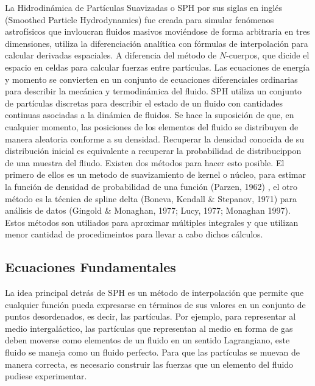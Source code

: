 \documentclass[a4paper,openright,12pt]{book}
\begin{document}
La Hidrodinámica de Partículas Suavizadas o SPH por sus siglas en inglés (Smoothed Particle Hydrodynamics) fue creada para simular fenómenos astrofísicos que invloucran fluidos masivos moviéndose de forma arbitraria en tres dimensiones, utiliza la diferenciación analítica con fórmulas de interpolación para calcular derivadas espaciales. A diferencia del método de $N$-cuerpos, que dicide el espacio en celdas para calcular fuerzas entre partículas. Las ecuaciones de energía y momento se convierten en un conjunto de ecuaciones diferenciales ordinarias para describir la mecánica y termodinámica del fluido. SPH utiliza un conjunto de partículas discretas para describir el estado de un fluido con cantidades continuas asociadas a la dinámica de fluidos. Se hace la suposición de que, en cualquier momento, las posiciones de los elementos del fluido se  distribuyen de manera aleatoria conforme a su densidad. Recuperar la densidad conocida de su distribución inicial es equivalente a recuperar la probabilidad de distribucippon de una muestra del fliudo. Existen dos métodos para hacer esto posible. El primero de ellos es un metodo de suavizamiento de kernel o núcleo, para estimar la función de densidad de probabilidad de una función (Parzen, 1962) \cite{b5.3}, el otro método es la técnica de spline delta (Boneva, Kendall \& Stepanov, 1971) \cite{b5.4} para análisis de datos (Gingold \& Monaghan, 1977; Lucy, 1977; Monaghan 1997)\cite{b6,b7}. Estos métodos son utiliados para aproximar múltiples integrales y que utilizan menor cantidad de procedimeintos para llevar a cabo dichos cálculos.

\subsection{Ecuaciones Fundamentales}
La idea principal detrás de SPH es un método de interpolación que permite que cualquier función pueda expresarse en términos de sus valores en un conjunto de puntos desordenados, es decir, las partículas. Por ejemplo, para representar al medio intergaláctico, las partículas que representan al medio en forma de gas deben moverse como elementos de un fluido en un sentido Lagrangiano, este fluido se maneja como un fluido perfecto. Para que las partículas se muevan de manera correcta, es necesario construir las fuerzas que un elemento del fluido pudiese experimentar. 
\end{document}
